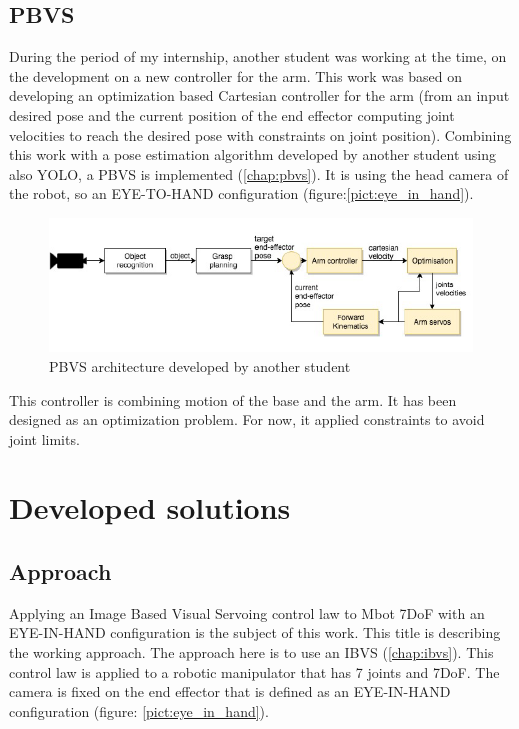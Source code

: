 \subsection{PBVS}

During the period of my internship, another student was working at the time, on the development on a new controller for the arm. This work was based on developing an optimization based Cartesian controller for the arm (from an input desired pose and the current position of the end effector computing joint velocities to reach the desired pose with constraints on joint position). Combining this work with a pose estimation algorithm developed by another student using also YOLO, a \gls{PBVS} is implemented (\ref{chap:pbvs}). It is using the head camera of the robot, so an EYE-TO-HAND configuration (figure:\ref{pict:eye_in_hand}).
\begin{figure} [!ht]
    \centering
    \includegraphics[width=0.95\linewidth]{images/pbvs.png}
    \caption{PBVS architecture developed by another student}
    \label{pict:pbvs_emilia}
\end{figure}

This controller is combining motion of the base and the arm. It has been designed as an optimization problem. For now, it applied constraints to avoid joint limits.

\section{Developed solutions}
\label{developed_solution}

\subsection{Approach}
Applying an Image Based Visual Servoing control law to Mbot 7DoF with an EYE-IN-HAND configuration is the subject of this work. This title is describing the working approach. The approach here is to use an \gls{IBVS} (\ref{chap:ibvs}). This control law is applied to a robotic manipulator that has 7 joints and 7\gls{DoF}. The camera is fixed on the end effector that is defined as an EYE-IN-HAND configuration (figure: \ref{pict:eye_in_hand}).

